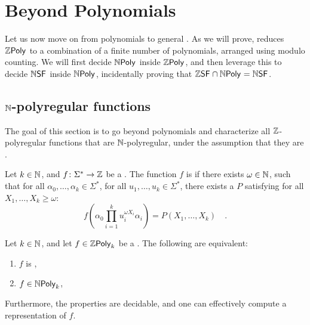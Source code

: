 \section{Beyond Polynomials}
\label{sec:deciding}

Let us now move on from polynomials to general . As we will prove,  reduces $\ZPoly$ to a
combination of a finite number of polynomials, arranged using modulo counting.
We will first decide $\NPoly$ inside $\ZPoly$, and then leverage this to decide
$\NSF$ inside $\NPoly$, incidentally proving that $\ZSF \cap \NPoly = \NSF$.

\subsection{$\mathbb{N}$-polyregular functions}

The goal of this section is to go beyond polynomials and characterize all
$\mathbb{Z}$-polyregular functions that are $\mathbb{N}$-polyregular, under the assumption
that they are .

\begin{definition}
    \label{k-combinatorial:def}
    Let $k \in \mathbb{N}$, and $f \colon \Sigma^* \to \mathbb{Z}$
    be a . The function $f$ is 
     if there exists $\omega \in \mathbb{N}$,
    such that
    for all
    $\alpha_0, \dots, \alpha_k \in \Sigma^*$,
    for all $u_1, \dots, u_k \in \Sigma^*$,
    there exists a  $P$
    satisfying for all $X_1, \dots, X_k \geq \omega$:
    \begin{equation*}
        f
        \left(
            \alpha_0 \prod_{i = 1}^k u_i^{\omega X_i} \alpha_i
        \right)
        = 
        P(X_1, \dots, X_k) \quad .
    \end{equation*}
\end{definition}

\begin{theorem}
    \label{decidable-n-poly:thm}
    Let $k \in \mathbb{N}$, and 
    let $f \in \ZPoly[k]$ be a  .
    The following are equivalent:
    \begin{enumerate}
        \item $f$ is ,
        \item $f \in \NPoly[k]$,
    \end{enumerate}
    Furthermore, the properties are decidable,
    and one can effectively compute a representation of $f$.
\end{theorem}

